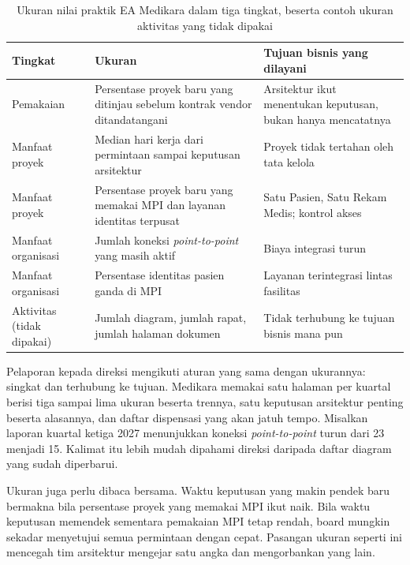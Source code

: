 \begin{table}[!htb]
  \centering
  \caption{Ukuran nilai praktik EA Medikara dalam tiga tingkat, beserta
           contoh ukuran aktivitas yang tidak dipakai}
  \label{tab:ch14-ukuran}
  \begin{tabularx}{\textwidth}{>{\raggedright\arraybackslash}p{2.9cm}>{\raggedright\arraybackslash}X>{\raggedright\arraybackslash}X}
    \hline
    \textbf{Tingkat} & \textbf{Ukuran} & \textbf{Tujuan bisnis yang dilayani} \\
    \hline
    Pemakaian & Persentase proyek baru yang ditinjau sebelum kontrak vendor
      ditandatangani & Arsitektur ikut menentukan keputusan, bukan hanya
      mencatatnya \\
    \hline
    Manfaat proyek & Median hari kerja dari permintaan sampai keputusan
      arsitektur & Proyek tidak tertahan oleh tata kelola \\
    \hline
    Manfaat proyek & Persentase proyek baru yang memakai MPI dan layanan
      identitas terpusat & Satu Pasien, Satu Rekam Medis; kontrol akses \\
    \hline
    Manfaat organisasi & Jumlah koneksi \textit{point-to-point} yang masih
      aktif & Biaya integrasi turun \\
    \hline
    Manfaat organisasi & Persentase identitas pasien ganda di MPI &
      Layanan terintegrasi lintas fasilitas \\
    \hline
    Aktivitas (tidak dipakai) & Jumlah diagram, jumlah rapat, jumlah
      halaman dokumen & Tidak terhubung ke tujuan bisnis mana pun \\
    \hline
  \end{tabularx}
\end{table}

Pelaporan kepada direksi mengikuti aturan yang sama dengan ukurannya:
singkat dan terhubung ke tujuan. Medikara memakai satu halaman per kuartal
berisi tiga sampai lima ukuran beserta trennya, satu keputusan arsitektur
penting beserta alasannya, dan daftar dispensasi yang akan jatuh tempo.
Misalkan laporan kuartal ketiga 2027 menunjukkan koneksi
\textit{point-to-point} turun dari 23 menjadi 15. Kalimat itu lebih mudah
dipahami direksi daripada daftar diagram yang sudah diperbarui.

Ukuran juga perlu dibaca bersama. Waktu keputusan yang makin pendek baru
bermakna bila persentase proyek yang memakai MPI ikut naik. Bila waktu
keputusan memendek sementara pemakaian MPI tetap rendah, board mungkin
sekadar menyetujui semua permintaan dengan cepat. Pasangan ukuran seperti
ini mencegah tim arsitektur mengejar satu angka dan mengorbankan yang lain.

